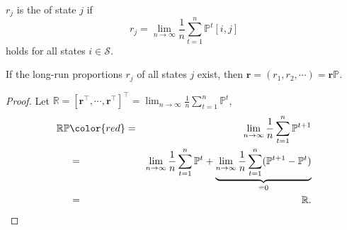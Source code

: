 \begin{definition}
$ r_{j} $ is the  of state $ j $ if
\[ r_{j} = \lim_{n \to \infty} \frac{1}{n} \sum_{t = 1}^{n} \mathbb{P}^{t}[i, j] \]
holds for all states $ i \in \mathcal{S} $.

\begin{comment}
Why this name?

Support $ N $ is a uniform distribution over $ \{ 1, \cdots, n \} $. The ``long-run proportion of state $ j $'' is
\begin{eqnarray*}
  &   & \lim_{n \to \infty} P(X(N) = j \mid X(0) = i) \\
  & = & \lim_{n \to \infty} P(X(N) = j \mid N = t, X(0) = i) \cdot P(N = t \mid X(0) = i) \\
  & = & \lim_{n \to \infty} P(X(N) = j \mid X(0) = i) \cdot \frac{1}{n} \\
  & = & \lim_{n \to \infty} \frac{1}{n} \sum_{t = 1}^{n} \mathbb{P}^{t}[i, j]
\end{eqnarray*}

(Proportion：state 在 t 時間內出現的比例有多高。)
\end{comment}
\end{definition}

\begin{lemma} \label{lem:r-eq-rp}
If the long-run proportions $ r_{j} $ of all states $ j $ exist, then $ \mathbf{r} = (r_{1}, r_{2}, \cdots) = \mathbf{r}\mathbb{P} $.

\begin{proof}
Let $ \mathbb{R} = [\mathbf{r}^{\intercal}, \cdots, \mathbf{r}^{\intercal}]^{\intercal} = \lim_{n \to \infty} \frac{1}{n} \sum_{t = 1}^{n} \mathbb{P}^{t} $,
\begin{eqnarray*}
\mathbb{R}\mathbb{P}
  & {\color{red} =} & \lim_{n \to \infty} \frac{1}{n} \sum_{t = 1}^{n} \mathbb{P}^{t + 1} \\
  & = & \lim_{n \to \infty} \frac{1}{n} \sum_{t = 1}^{n} \mathbb{P}^{t}
      + \underbrace{\lim_{n \to \infty} \frac{1}{n} \sum_{t = 1}^{n} (\mathbb{P}^{t + 1} - \mathbb{P}^{t})}_{= 0} \\
  & = & \mathbb{R}.
\end{eqnarray*}
\end{proof}
\end{lemma}

